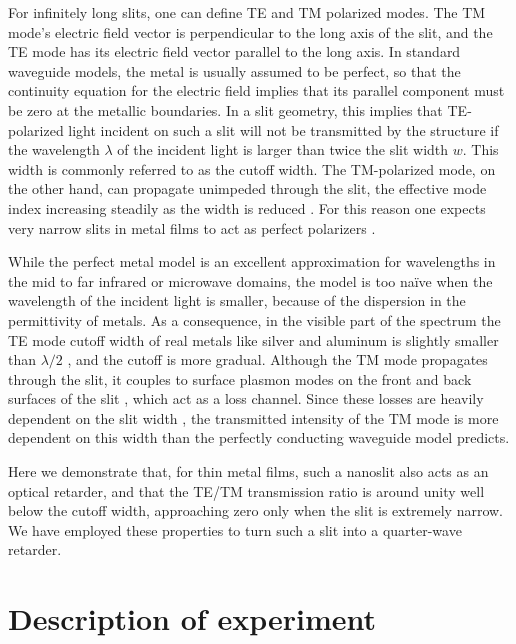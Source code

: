 For infinitely long slits, one can define \gls{TE} and \gls{TM} polarized modes.
The \gls{TM} mode's electric field vector is perpendicular to the long axis of the slit, and the \gls{TE} mode has its electric field vector parallel to the long axis.
In standard waveguide models, the metal is usually assumed to be perfect, so that the continuity equation for the electric field implies that its parallel component must be zero at the metallic boundaries.
In a slit geometry, this implies that \gls{TE}-polarized light incident on such a slit will not be transmitted by the structure if the wavelength $\lambda$ of the incident light is larger than twice the slit width $w$.
This width is commonly referred to as the cutoff width.
The \gls{TM}-polarized mode, on the other hand, can propagate unimpeded through the slit, the effective mode index increasing steadily as the width is reduced \cite{Astilean2000,Takakura2001}.
For this reason one expects very narrow slits in metal films to act as perfect polarizers \cite{Fizeau1861}.

While the perfect metal model is an excellent approximation for wavelengths in the mid to far infrared or microwave domains, the model is too na\"ive when the wavelength of the incident light is smaller, because of the dispersion in the permittivity of metals.
As a consequence, in the visible part of the spectrum the \gls{TE} mode cutoff width of real metals like silver and aluminum is slightly smaller than $\lambda/2$ \cite{Schouten2003,Schouten2004}, and the cutoff is more gradual.
Although the \gls{TM} mode propagates through the slit, it couples to surface plasmon modes on the front and back surfaces of the slit \cite{Schouten2005}, which act as a loss channel.
Since these losses are heavily dependent on the slit width \cite{Lalanne2006,Baudrion2008,Kihm2008}, the transmitted intensity of the \gls{TM} mode is more dependent on this width than the perfectly conducting waveguide model predicts.

Here we demonstrate that, for thin metal films, such a nanoslit also acts as an optical retarder, and that the \gls{TE}/\gls{TM} transmission ratio is around unity well below the cutoff width, approaching zero only when the slit is extremely narrow.
We have employed these properties to turn such a slit into a quarter-wave retarder.

\section{Description of experiment}

